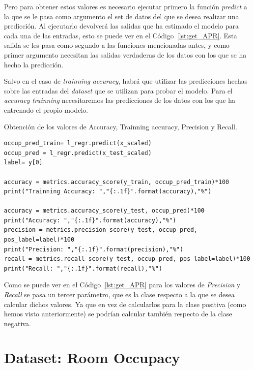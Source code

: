 \documentclass[a4paper, 12pt]{book}
\begin{document}
Pero para obtener estos valores es necesario ejecutar primero la función \textit{predict} a la que se le pasa como argumento el set de datos del que se desea realizar una predicción. Al ejecutarlo devolverá las salidas que ha estimado el modelo para cada una de las entradas, esto se puede ver en el Código~\ref{lst:get_APR}. Esta salida se les pasa como segundo a las funciones mencionadas antes, y como primer argumento necesitan las salidas verdaderas de los datos con los que se ha hecho la predicción. 

Salvo en el caso de \textit{trainning accuracy}, habrá que utilizar las predicciones hechas sobre las entradas del \textit{dataset} que se utilizan para probar el modelo. Para el \textit{accuracy trainning} necesitaremos las predicciones de los datos con los que ha entrenado el propio modelo.

\begin{listing}[htb]
    \caption{Obtención de los valores de Accuracy, Trainning accuracy, Precision y Recall.}{}
    \label{lst:get_APR}
    \begin{verbatim}
occup_pred_train= l_regr.predict(x_scaled)
occup_pred = l_regr.predict(x_test_scaled)    
label= y[0]

accuracy = metrics.accuracy_score(y_train, occup_pred_train)*100
print("Trainning Accuracy: ","{:.1f}".format(accuracy),"%")

accuracy = metrics.accuracy_score(y_test, occup_pred)*100
print("Accuracy: ","{:.1f}".format(accuracy),"%")
precision = metrics.precision_score(y_test, occup_pred, pos_label=label)*100
print("Precision: ","{:.1f}".format(precision),"%")
recall = metrics.recall_score(y_test, occup_pred, pos_label=label)*100
print("Recall: ","{:.1f}".format(recall),"%")
    \end{verbatim}
\end{listing}

Como se puede ver en el Código~\ref{lst:get_APR} para los valores de \textit{Precision} y \textit{Recall} se pasa un tercer parámetro, que es la clase respecto a la que se desea calcular dichos valores. Ya que en vez de calcularlos para la clase positiva (como hemos visto anteriormente) se podrían calcular también respecto de la clase negativa.

\section{Dataset: Room Occupacy}
\label{sec:dataSet_Occupancy}
\end{document}
